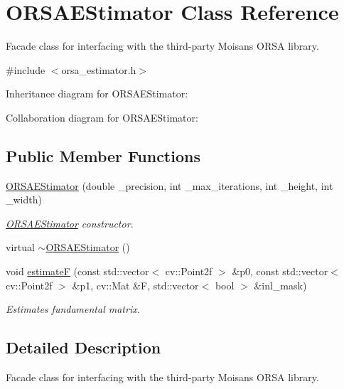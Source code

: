 \hypertarget{classORSAEStimator}{}\section{O\+R\+S\+A\+E\+Stimator Class Reference}
\label{classORSAEStimator}


Facade class for interfacing with the third-\/party Moisan\textquotesingle{}s O\+R\+S\+A library.  




{\ttfamily \#include $<$orsa\+\_\+estimator.\+h$>$}



Inheritance diagram for O\+R\+S\+A\+E\+Stimator\+:


Collaboration diagram for O\+R\+S\+A\+E\+Stimator\+:
\subsection*{Public Member Functions}
\begin{DoxyCompactItemize}
\item 
\hyperlink{classORSAEStimator_a1390521e388700aeb1f7202f6aa83706}{O\+R\+S\+A\+E\+Stimator} (double \+\_\+precision, int \+\_\+max\+\_\+iterations, int \+\_\+height, int \+\_\+width)
\begin{DoxyCompactList}\small\item\em \hyperlink{classORSAEStimator}{O\+R\+S\+A\+E\+Stimator} constructor. \end{DoxyCompactList}\item 
virtual \hyperlink{classORSAEStimator_a5589de65e839f0a8f145e33bca51565f}{$\sim$\+O\+R\+S\+A\+E\+Stimator} ()
\item 
void \hyperlink{classORSAEStimator_aeafb56f7f64260df6676a7de5e909456}{estimate\+F} (const std\+::vector$<$ cv\+::\+Point2f $>$ \&p0, const std\+::vector$<$ cv\+::\+Point2f $>$ \&p1, cv\+::\+Mat \&F, std\+::vector$<$ bool $>$ \&inl\+\_\+mask)
\begin{DoxyCompactList}\small\item\em Estimates fundamental matrix. \end{DoxyCompactList}\end{DoxyCompactItemize}


\subsection{Detailed Description}
Facade class for interfacing with the third-\/party Moisan\textquotesingle{}s O\+R\+S\+A library. 

